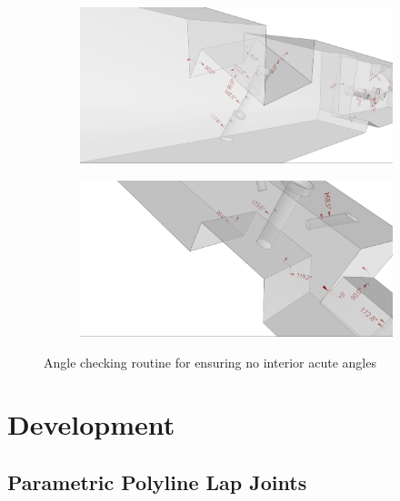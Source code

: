\begin{figure}[!h]
    \centering
    \begin{subfigure}[b]{0.49\textwidth}
        \centering
        \includegraphics[width=\textwidth]{images/7a/img06.jpg}
    \end{subfigure}
    \hfill
    \begin{subfigure}[b]{0.49\textwidth}
        \centering
        \includegraphics[width=\textwidth]{images/7a/img07.jpg}
    \end{subfigure}
    \caption{Angle checking routine for ensuring no interior acute angles}
    \label{fig:angle-checking-routine}
\end{figure}


\section{Development}
\label{section:exploration-4-development}

\subsection{Parametric Polyline Lap Joints}
\label{subsection:exploration-4-parametric-polyline-lap-joints}

